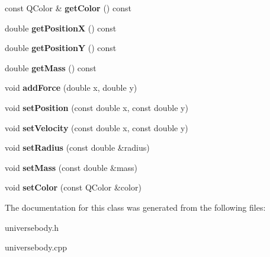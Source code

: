 \begin{DoxyCompactItemize}
\item 
const Q\+Color \& {\bfseries get\+Color} () const\hypertarget{classUniverseBody_a317a6bb602fa64d6bc672bafb493ecb6}{}\label{classUniverseBody_a317a6bb602fa64d6bc672bafb493ecb6}

\item 
double {\bfseries get\+PositionX} () const\hypertarget{classUniverseBody_a4bad5fe82362af021b3798f0739df4ef}{}\label{classUniverseBody_a4bad5fe82362af021b3798f0739df4ef}

\item 
double {\bfseries get\+PositionY} () const\hypertarget{classUniverseBody_a6ae3f80f3cad5a943ff40622cf81fbdc}{}\label{classUniverseBody_a6ae3f80f3cad5a943ff40622cf81fbdc}

\item 
double {\bfseries get\+Mass} () const\hypertarget{classUniverseBody_a45d334390363d63200ff668f524477b0}{}\label{classUniverseBody_a45d334390363d63200ff668f524477b0}

\item 
void {\bfseries add\+Force} (double x, double y)\hypertarget{classUniverseBody_aae9f301e3dffe3c4d5ce4ce1c2bc6591}{}\label{classUniverseBody_aae9f301e3dffe3c4d5ce4ce1c2bc6591}

\item 
void {\bfseries set\+Position} (const double x, const double y)\hypertarget{classUniverseBody_aa15ba5311d80474c6f74e2fbbf39bd54}{}\label{classUniverseBody_aa15ba5311d80474c6f74e2fbbf39bd54}

\item 
void {\bfseries set\+Velocity} (const double x, const double y)\hypertarget{classUniverseBody_ae34bed5731be5dfba2a86f1ee5fa40ca}{}\label{classUniverseBody_ae34bed5731be5dfba2a86f1ee5fa40ca}

\item 
void {\bfseries set\+Radius} (const double \&radius)\hypertarget{classUniverseBody_a9c609437abfacd5bfb3772e6d32fb0fb}{}\label{classUniverseBody_a9c609437abfacd5bfb3772e6d32fb0fb}

\item 
void {\bfseries set\+Mass} (const double \&mass)\hypertarget{classUniverseBody_ad01381589096b71035595502829ed039}{}\label{classUniverseBody_ad01381589096b71035595502829ed039}

\item 
void {\bfseries set\+Color} (const Q\+Color \&color)\hypertarget{classUniverseBody_a464502083e736aa7472d8ea3c64c695e}{}\label{classUniverseBody_a464502083e736aa7472d8ea3c64c695e}

\end{DoxyCompactItemize}


The documentation for this class was generated from the following files\+:\begin{DoxyCompactItemize}
\item 
universebody.\+h\item 
universebody.\+cpp\end{DoxyCompactItemize}
